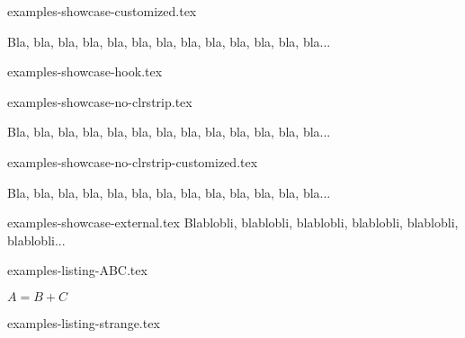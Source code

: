 \begin{filecontents*}[overwrite]{examples-showcase-customized.tex}
\begin{tdocshowcase}[before = My beginning,
                     after  = My end,
                     color  = red]
Bla, bla, bla, bla, bla, bla, bla, bla, bla, bla, bla, bla, bla...
\end{tdocshowcase}
\end{filecontents*}


\begin{filecontents*}[overwrite]{examples-showcase-hook.tex}
\begin{tdocshowcase}
\end{tdocshowcase}
\end{filecontents*}


\begin{filecontents*}[overwrite]{examples-showcase-no-clrstrip.tex}
\begin{tdocshowcase}[nostripe]
    Bla, bla, bla, bla, bla, bla, bla, bla, bla, bla, bla, bla, bla...
\end{tdocshowcase}
\end{filecontents*}


\begin{filecontents*}[overwrite]{examples-showcase-no-clrstrip-customized.tex}
\begin{tdocshowcase}[nostripe,
                     before = My beginning,
                     after  = My end,
                     color  = green]
Bla, bla, bla, bla, bla, bla, bla, bla, bla, bla, bla, bla, bla...
\end{tdocshowcase}

\end{filecontents*}


\begin{filecontents*}[overwrite]{examples-showcase-external.tex}
Blablobli, blablobli, blablobli, blablobli, blablobli, blablobli...
\end{filecontents*}


\begin{filecontents*}[overwrite]{examples-listing-ABC.tex}
\begin{tdoclatex}[sbs]
    $A = B + C$
\end{tdoclatex}
\end{filecontents*}


\begin{filecontents*}[overwrite]{examples-listing-strange.tex}
\begin{tdoclatex}
\end{tdoclatex}
\end{filecontents*}


